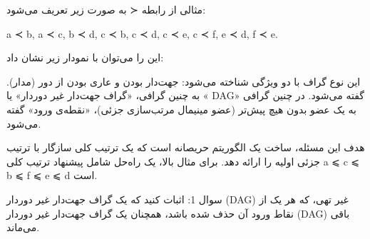 \documentclass{book} %
\begin{document}
مثالی از رابطه ≺ به صورت زیر تعریف می‌شود:

a ≺ b, a ≺ c, b ≺ d, c ≺ b, c ≺ d, c ≺ e, c ≺ f, e ≺ d, f ≺ e.

این را می‌توان با نمودار زیر نشان داد:

این نوع گراف با دو ویژگی شناخته می‌شود: جهت‌دار بودن و عاری بودن از دور
(مدار). به چنین گرافی، «گراف جهت‌دار غیر دوردار» یا « DAG» گفته می‌شود. در چنین
گرافی به یک عضو بدون هیچ پیش‌تر (عضو مینیمال مرتب‌سازی جزئی)، «نقطه‌ی ورود»
گفته می‌شود.

هدف این مسئله، ساخت یک الگوریتم حریصانه است که یک ترتیب کلی سازگار با ترتیب جزئی اولیه را ارائه دهد. برای مثال بالا، یک راه‌حل شامل پیشنهاد ترتیب کلی a ⩽ c ⩽ b ⩽ f ⩽ e ⩽ d  است.

سوال 1: اثبات کنید که یک گراف جهت‌دار غیر دوردار (DAG) غیر تهی، که هر یک از نقاط ورود آن حذف
شده باشد، همچنان یک گراف جهت‌دار غیر دوردار (DAG) باقی می‌ماند.
\end{document}
